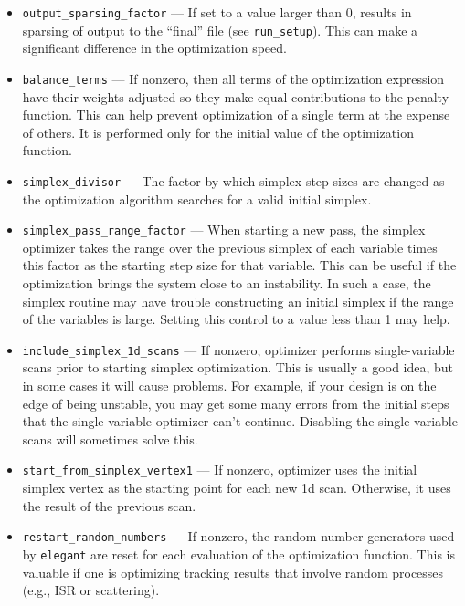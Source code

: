 \documentclass[11pt]{article}
\begin{document}
\begin{itemize}
\item \verb|output_sparsing_factor| --- If set to a value larger than 0, results in
sparsing of output to the ``final'' file (see \verb|run_setup|). This can make
a significant difference in the optimization speed.

\item \verb|balance_terms| --- If nonzero, then all terms of the optimization expression have
 their weights adjusted so they make equal contributions to the penalty function.  This can
 help prevent optimization of a single term at the expense of others.  It is performed only 
 for the initial value of the optimization function.

\item \verb|simplex_divisor| --- The factor by which simplex step sizes are changed as the 
 optimization algorithm searches for a valid initial simplex.

\item \verb|simplex_pass_range_factor| --- When starting a new pass, the simplex optimizer takes
 the range over the previous simplex of each variable times this factor
 as the starting step size for that variable.  This can be useful if the optimization brings
 the system close to an instability.  In such a case, the simplex routine may have trouble
 constructing an initial simplex if the range of the variables is large. Setting this control
 to a value less than 1 may help.
 
\item \verb|include_simplex_1d_scans| --- If nonzero, optimizer performs single-variable scans prior to 
 starting simplex optimization.  This is usually a good idea, but in some cases it will cause problems.
 For example, if your design is on the edge of being unstable, you may get some many errors from the
 initial steps that the single-variable optimizer can't continue.  Disabling the
 single-variable scans will sometimes solve this.

\item \verb|start_from_simplex_vertex1| --- If nonzero, optimizer uses the initial simplex vertex as the
 starting point for each new 1d scan.  Otherwise, it uses the result of the previous scan.

\item \verb|restart_random_numbers| --- If nonzero, the random number generators used by {\tt elegant} are
 reset for each evaluation of the optimization function.  This is valuable if one is optimizing tracking
 results that involve random processes (e.g., ISR or scattering).

\end{itemize}
\end{document}
